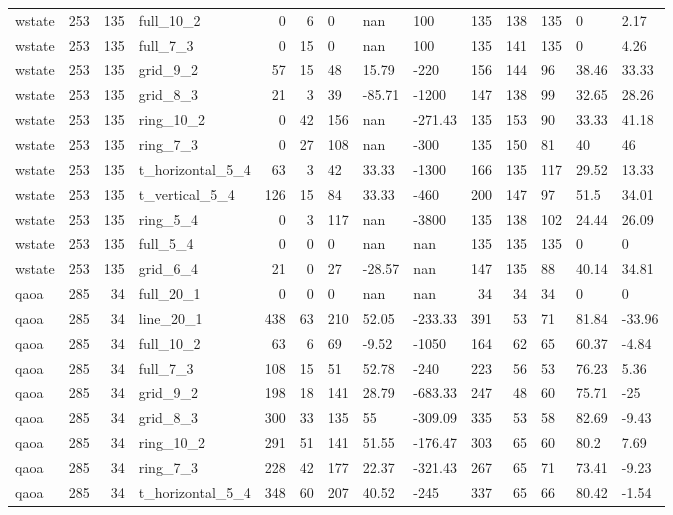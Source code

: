 \begin{longtable}{lrrlrrlllrrlll}
wstate & 253 & 135 & full\_10\_2 & 0 & 6 & 0 & nan & 100 & 135 & 138 & 135 & 0 & 2.17 \\
wstate & 253 & 135 & full\_7\_3 & 0 & 15 & 0 & nan & 100 & 135 & 141 & 135 & 0 & 4.26 \\
wstate & 253 & 135 & grid\_9\_2 & 57 & 15 & 48 & 15.79 & -220 & 156 & 144 & 96 & 38.46 & 33.33 \\
wstate & 253 & 135 & grid\_8\_3 & 21 & 3 & 39 & -85.71 & -1200 & 147 & 138 & 99 & 32.65 & 28.26 \\
wstate & 253 & 135 & ring\_10\_2 & 0 & 42 & 156 & nan & -271.43 & 135 & 153 & 90 & 33.33 & 41.18 \\
wstate & 253 & 135 & ring\_7\_3 & 0 & 27 & 108 & nan & -300 & 135 & 150 & 81 & 40 & 46 \\
wstate & 253 & 135 & t\_horizontal\_5\_4 & 63 & 3 & 42 & 33.33 & -1300 & 166 & 135 & 117 & 29.52 & 13.33 \\
wstate & 253 & 135 & t\_vertical\_5\_4 & 126 & 15 & 84 & 33.33 & -460 & 200 & 147 & 97 & 51.5 & 34.01 \\
wstate & 253 & 135 & ring\_5\_4 & 0 & 3 & 117 & nan & -3800 & 135 & 138 & 102 & 24.44 & 26.09 \\
wstate & 253 & 135 & full\_5\_4 & 0 & 0 & 0 & nan & nan & 135 & 135 & 135 & 0 & 0 \\
wstate & 253 & 135 & grid\_6\_4 & 21 & 0 & 27 & -28.57 & nan & 147 & 135 & 88 & 40.14 & 34.81 \\
qaoa & 285 & 34 & full\_20\_1 & 0 & 0 & 0 & nan & nan & 34 & 34 & 34 & 0 & 0 \\
qaoa & 285 & 34 & line\_20\_1 & 438 & 63 & 210 & 52.05 & -233.33 & 391 & 53 & 71 & 81.84 & -33.96 \\
qaoa & 285 & 34 & full\_10\_2 & 63 & 6 & 69 & -9.52 & -1050 & 164 & 62 & 65 & 60.37 & -4.84 \\
qaoa & 285 & 34 & full\_7\_3 & 108 & 15 & 51 & 52.78 & -240 & 223 & 56 & 53 & 76.23 & 5.36 \\
qaoa & 285 & 34 & grid\_9\_2 & 198 & 18 & 141 & 28.79 & -683.33 & 247 & 48 & 60 & 75.71 & -25 \\
qaoa & 285 & 34 & grid\_8\_3 & 300 & 33 & 135 & 55 & -309.09 & 335 & 53 & 58 & 82.69 & -9.43 \\
qaoa & 285 & 34 & ring\_10\_2 & 291 & 51 & 141 & 51.55 & -176.47 & 303 & 65 & 60 & 80.2 & 7.69 \\
qaoa & 285 & 34 & ring\_7\_3 & 228 & 42 & 177 & 22.37 & -321.43 & 267 & 65 & 71 & 73.41 & -9.23 \\
qaoa & 285 & 34 & t\_horizontal\_5\_4 & 348 & 60 & 207 & 40.52 & -245 & 337 & 65 & 66 & 80.42 & -1.54 \\

\end{longtable}
